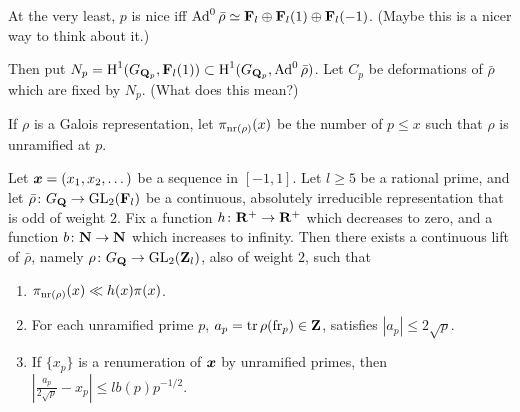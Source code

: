 At the very least, $p$ is nice iff 
$\operatorname{Ad}^0 \bar\rho\simeq \mathbf{F}_l\oplus \mathbf{F}_l(1)\oplus \mathbf{F}_l(-1)$. (Maybe this is a 
nicer way to think about it.)

Then put $N_p = \operatorname{H}^1(G_{\mathbf{Q}_p},\mathbf{F}_l(1))\subset \operatorname{H}^1(G_{\mathbf{Q}_p},\operatorname{Ad}^0\bar\rho)$. 
Let $C_p$ be deformations of $\bar\rho$ which are fixed by $N_p$. (What does 
this mean?)





If $\rho$ is a Galois representation, let $\pi_{\mathrm{nr}(\rho)}(x)$ be the number of 
$p\leqslant x$ such that $\rho$ is unramified at $p$. 

\begin{theorem}
Let ${\boldsymbol x}=(x_1,x_2,\dots)$ be a sequence in $[-1,1]$. Let $l\geqslant 5$ be a 
rational prime, and let $\bar\rho\colon G_{\mathbf{Q}} \to \operatorname{GL}_2(\mathbf{F}_l)$ be a continuous, 
absolutely irreducible representation that is odd of weight $2$. Fix a function 
$h\colon \mathbf{R}^+ \to \mathbf{R}^+$ which decreases to zero, and a function 
$b\colon \mathbf{N} \to \mathbf{N}$ which increases to infinity. Then there exists a 
continuous lift of $\bar\rho$, namely  $\rho\colon G_{\mathbf{Q}}\to \operatorname{GL}_2(\mathbf{Z}_l)$, also 
of weight $2$, such that 
\begin{enumerate}
\item
$\pi_{\mathrm{nr}(\rho)}(x) \ll h(x) \pi(x)$.

\item
For each unramified prime $p$, $a_p = \operatorname{tr} \rho(\mathrm{fr}_p)\in \mathbf{Z}$, satisfies 
$|a_p| \leqslant 2\sqrt p$.

\item
If $\{x_p\}$ is a renumeration of ${\boldsymbol x}$ by unramified primes, then 
$\left|\frac{a_p}{2\sqrt p} - x_p\right| \leqslant l b(p) p^{-1/2}$. 
\end{enumerate}
\end{theorem}
